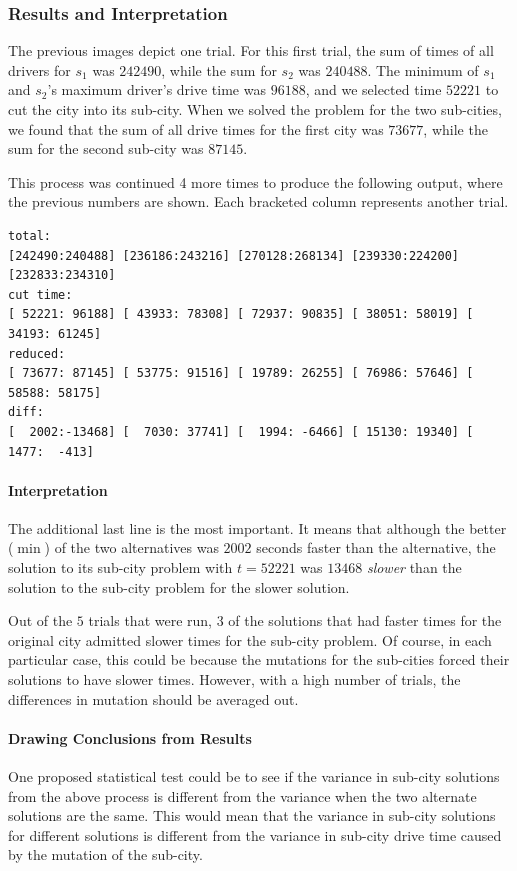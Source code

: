 \documentclass{article}
\begin{document}
\subsubsection{Results and Interpretation}
The previous images depict one trial.
For this first trial, the sum of times of all drivers for $s_1$ was $242490$, while the sum for $s_2$ was $240488$.
The minimum of $s_1$ and $s_2$'s maximum driver's drive time was $96188$, and we selected time $52221$ to cut the city into its sub-city.
When we solved the problem for the two sub-cities, we found that the sum of all drive times for the first city was $73677$, while the sum for the second sub-city was $87145$.

This process was continued 4 more times to produce the following output, where the previous numbers are shown.
Each bracketed column represents another trial.
\begin{verbatim}
total:
[242490:240488] [236186:243216] [270128:268134] [239330:224200] [232833:234310] 
cut time:
[ 52221: 96188] [ 43933: 78308] [ 72937: 90835] [ 38051: 58019] [ 34193: 61245] 
reduced:
[ 73677: 87145] [ 53775: 91516] [ 19789: 26255] [ 76986: 57646] [ 58588: 58175] 
diff:
[  2002:-13468] [  7030: 37741] [  1994: -6466] [ 15130: 19340] [  1477:  -413] 
\end{verbatim}

\paragraph{Interpretation}
The additional last line is the most important.
It means that although the better ($\min$) of the two alternatives was $2002$ seconds faster than the alternative, the solution to its sub-city problem with $t=52221$ was $13468$ \emph{slower} than the solution to the sub-city problem for the slower solution.

Out of the $5$ trials that were run, $3$ of the solutions that had faster times for the original city admitted slower times for the sub-city problem.
Of course, in each particular case, this could be because the mutations for the sub-cities forced their solutions to have slower times.
However, with a high number of trials, the differences in mutation should be averaged out.

\paragraph{Drawing Conclusions from Results}
One proposed statistical test could be to see if the variance in sub-city solutions from the above process is different from the variance when the two alternate solutions are the same.
This would mean that the variance in sub-city solutions for different solutions is different from the variance in sub-city drive time caused by the mutation of the sub-city.
\end{document}
